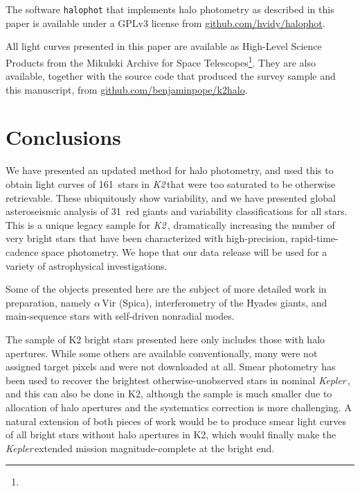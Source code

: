 \documentclass[modern]{aastex62}
\newcommand\kepler{\emph{Kepler}\,}
\newcommand\ktwo{\emph{K2}\,}
\begin{document}
The software \texttt{halophot} that implements halo photometry as described in this paper is available under a GPLv3 license from \href{https://github.com/hvidy/halophot}{github.com/hvidy/halophot}. 

All light curves presented in this paper are available as High-Level Science Products from the Mikulski Archive for Space Telescopes\footnote{}.  They are also available, together with the source code that produced the survey sample and this manuscript, from \href{https://github.com/benjaminpope/k2halo}{github.com/benjaminpope/k2halo}.

\section{Conclusions}
\label{sec:conclusions}

We have presented an updated method for halo photometry, and used this to obtain light curves of 161~stars in \ktwo that were too saturated to be otherwise retrievable. These ubiquitously show variability, and we have presented global asteroseismic analysis of 31~red giants and variability classifications for all stars. This is a unique legacy sample for \ktwo, dramatically increasing the number of very bright stars that have been characterized with high-precision, rapid-time-cadence space photometry. We hope that our data release will be used for a variety of astrophysical investigations.

Some of the objects presented here are the subject of more detailed work in preparation, namely $\alpha$\,Vir (Spica), interferometry of the Hyades giants, and main-sequence stars with self-driven nonradial modes.

The sample of K2 bright stars presented here only includes those with halo apertures. While some others are available conventionally, many were not assigned target pixels and were not downloaded at all. Smear photometry has been used to recover the brightest otherwise-unobserved stars in nominal \kepler \citep{smearcampaign}, and this can also be done in K2, although the sample is much smaller due to allocation of halo apertures and the systematics correction is more challenging. A natural extension of both pieces of work would be to produce smear light curves of all bright stars without halo apertures in K2, which would finally make the \kepler extended mission magnitude-complete at the bright end. 
\end{document}
